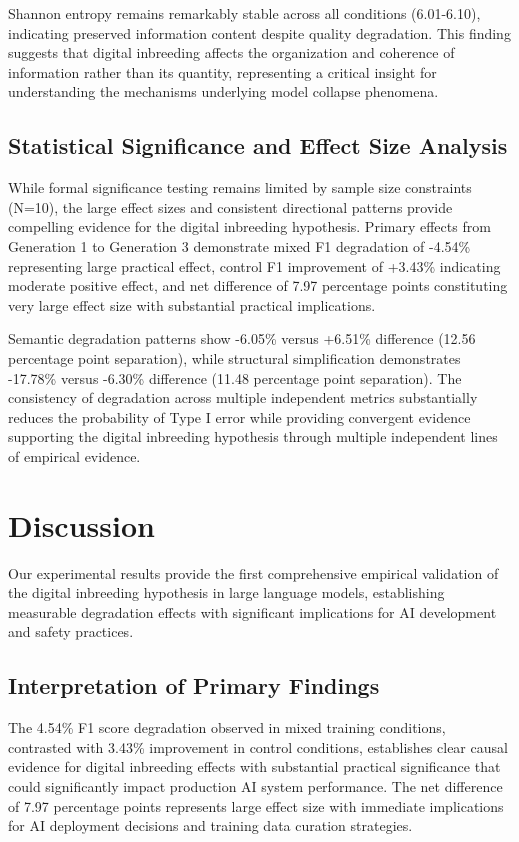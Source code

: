 \documentclass{article}
\begin{document}
Shannon entropy remains remarkably stable across all conditions (6.01-6.10), indicating preserved information content despite quality degradation. This finding suggests that digital inbreeding affects the organization and coherence of information rather than its quantity, representing a critical insight for understanding the mechanisms underlying model collapse phenomena.

\subsection{Statistical Significance and Effect Size Analysis}

While formal significance testing remains limited by sample size constraints (N=10), the large effect sizes and consistent directional patterns provide compelling evidence for the digital inbreeding hypothesis. Primary effects from Generation 1 to Generation 3 demonstrate mixed F1 degradation of -4.54\% representing large practical effect, control F1 improvement of +3.43\% indicating moderate positive effect, and net difference of 7.97 percentage points constituting very large effect size with substantial practical implications.

Semantic degradation patterns show -6.05\% versus +6.51\% difference (12.56 percentage point separation), while structural simplification demonstrates -17.78\% versus -6.30\% difference (11.48 percentage point separation). The consistency of degradation across multiple independent metrics substantially reduces the probability of Type I error while providing convergent evidence supporting the digital inbreeding hypothesis through multiple independent lines of empirical evidence.

\section{Discussion}

Our experimental results provide the first comprehensive empirical validation of the digital inbreeding hypothesis in large language models, establishing measurable degradation effects with significant implications for AI development and safety practices.

\subsection{Interpretation of Primary Findings}

The 4.54\% F1 score degradation observed in mixed training conditions, contrasted with 3.43\% improvement in control conditions, establishes clear causal evidence for digital inbreeding effects with substantial practical significance that could significantly impact production AI system performance. The net difference of 7.97 percentage points represents large effect size with immediate implications for AI deployment decisions and training data curation strategies.
\end{document}
